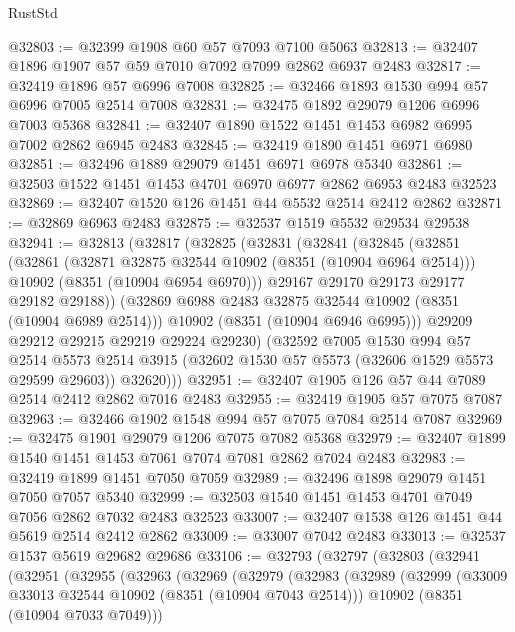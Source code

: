 \begin{lexlean}{RustStd}
\begin{coremodule}
@32803 := @32399 @1908 @60 @57 @7093 @7100 @5063
@32813 := @32407 @1896 @1907 @57 @59 @7010 @7092 @7099 @2862 @6937 @2483
@32817 := @32419 @1896 @57 @6996 @7008
@32825 := @32466 @1893 @1530 @994 @57 @6996 @7005 @2514 @7008
@32831 := @32475 @1892 @29079 @1206 @6996 @7003 @5368
@32841 := @32407 @1890 @1522 @1451 @1453 @6982 @6995 @7002 @2862 @6945 @2483
@32845 := @32419 @1890 @1451 @6971 @6980
@32851 := @32496 @1889 @29079 @1451 @6971 @6978 @5340
@32861 := @32503 @1522 @1451 @1453 @4701 @6970 @6977 @2862 @6953 @2483 @32523
@32869 := @32407 @1520 @126 @1451 @44 @5532 @2514 @2412 @2862
@32871 := @32869 @6963 @2483
@32875 := @32537 @1519 @5532 @29534 @29538
@32941 := @32813
    (@32817
      (@32825
        (@32831
          (@32841
            (@32845
              (@32851
                (@32861
                  (@32871 @32875 @32544 @10902 (@8351 (@10904 @6964 @2514)))
                  @10902
                  (@8351 (@10904 @6954 @6970)))
                @29167
                @29170
                @29173
                @29177
                @29182
                @29188))
            (@32869 @6988 @2483 @32875 @32544 @10902 (@8351 (@10904 @6989 @2514)))
            @10902
            (@8351 (@10904 @6946 @6995)))
          @29209
          @29212
          @29215
          @29219
          @29224
          @29230)
        (@32592
          @7005
          @1530
          @994
          @57
          @2514
          @5573
          @2514
          @3915
          (@32602 @1530 @57 @5573 (@32606 @1529 @5573 @29599 @29603))
          @32620)))
@32951 := @32407 @1905 @126 @57 @44 @7089 @2514 @2412 @2862 @7016 @2483
@32955 := @32419 @1905 @57 @7075 @7087
@32963 := @32466 @1902 @1548 @994 @57 @7075 @7084 @2514 @7087
@32969 := @32475 @1901 @29079 @1206 @7075 @7082 @5368
@32979 := @32407 @1899 @1540 @1451 @1453 @7061 @7074 @7081 @2862 @7024 @2483
@32983 := @32419 @1899 @1451 @7050 @7059
@32989 := @32496 @1898 @29079 @1451 @7050 @7057 @5340
@32999 := @32503 @1540 @1451 @1453 @4701 @7049 @7056 @2862 @7032 @2483 @32523
@33007 := @32407 @1538 @126 @1451 @44 @5619 @2514 @2412 @2862
@33009 := @33007 @7042 @2483
@33013 := @32537 @1537 @5619 @29682 @29686
@33106 := @32793
    (@32797
      (@32803
        (@32941
          (@32951
            (@32955
              (@32963
                (@32969
                  (@32979
                    (@32983
                      (@32989
                        (@32999
                          (@33009 @33013 @32544 @10902 (@8351 (@10904 @7043 @2514)))
                          @10902
                          (@8351 (@10904 @7033 @7049)))

\end{coremodule}
\end{lexlean}
